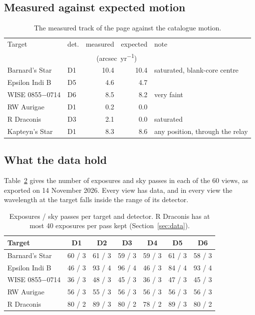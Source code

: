 \documentclass[11pt,a4paper]{article}
\begin{document}
\subsection{Measured against expected motion}
\begin{table}[h]
\centering
\small
\begin{tabular}{@{}llrrl@{}}
\toprule
Target & det. & measured & expected & note \\
 & & \multicolumn{2}{c}{(\si{arcsec.yr^{-1}})} & \\
\midrule
Barnard's Star   & D1 & 10.4 & 10.4 & saturated, blank-core centre \\
Epsilon Indi B   & D5 & 4.6 & 4.7 & \\
WISE 0855$-$0714 & D6 & 8.5 & 8.2 & very faint \\
RW Aurigae       & D1 & 0.2 & 0.0 & \\
R Draconis       & D3 & 2.1 & 0.0 & saturated \\
Kapteyn's Star   & D1 & 8.3 & 8.6 & any position, through the relay \\
\bottomrule
\end{tabular}
\caption{The measured track of the page against the catalogue motion.}
\label{tab:track}
\end{table}

\subsection{What the data hold}
Table~\ref{tab:counts} gives the number of exposures and sky passes in each of the 60 views, as
exported on 14 November 2026. Every view has data, and in every view the wavelength at the
target falls inside the range of its detector.

\begin{table}[h]
\centering
\small
\begin{tabular}{@{}lcccccc@{}}
\toprule
Target & D1 & D2 & D3 & D4 & D5 & D6 \\
\midrule
Barnard's Star   & 60 / 3 & 61 / 3 & 59 / 3 & 59 / 3 & 61 / 3 & 58 / 3 \\
Epsilon Indi B   & 46 / 3 & 93 / 4 & 96 / 4 & 46 / 3 & 84 / 4 & 93 / 4 \\
WISE 0855$-$0714 & 36 / 3 & 48 / 3 & 45 / 3 & 36 / 3 & 47 / 3 & 45 / 3 \\
RW Aurigae       & 56 / 3 & 55 / 3 & 56 / 3 & 56 / 3 & 56 / 3 & 56 / 3 \\
R Draconis       & 80 / 2 & 89 / 3 & 80 / 2 & 78 / 2 & 89 / 3 & 80 / 2 \\
\bottomrule
\end{tabular}
\caption{Exposures / sky passes per target and detector. R Draconis has at most 40 exposures per
pass kept (Section~\ref{sec:data}).}
\label{tab:counts}
\end{table}
\end{document}
